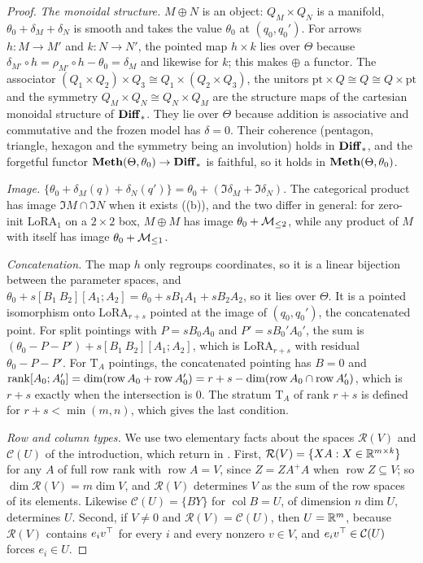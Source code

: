 \begin{proof}
\emph{The monoidal structure.} $M\oplus N$ is an object: $Q_M\times Q_N$ is a manifold, $\theta_0+\delta_M+\delta_N$ is
smooth and takes the value $\theta_0$ at $(q_0,q_0')$. For arrows $h:M\to M'$ and $k:N\to N'$, the pointed map $h\times k$
lies over $\Theta$ because $\delta_{M'}\circ h=\rho_{M'}\circ h-\theta_0=\delta_M$ and likewise for $k$; this makes $\oplus$
a functor. The associator $(Q_1\times Q_2)\times Q_3\cong Q_1\times(Q_2\times Q_3)$, the unitors
$\mathrm{pt}\times Q\cong Q\cong Q\times\mathrm{pt}$ and the symmetry $Q_M\times Q_N\cong Q_N\times Q_M$ are the
structure maps of the cartesian monoidal structure of $\mathbf{Diff}_*$. They lie over $\Theta$ because addition is associative and
commutative and the frozen model has $\delta=0$. Their coherence (pentagon, triangle, hexagon and the symmetry being an
involution) holds in $\mathbf{Diff}_*$, and the forgetful functor $\mathbf{Meth}(\Theta,\theta_0)\to\mathbf{Diff}_*$ is faithful, so it holds in
$\mathbf{Meth}(\Theta,\theta_0)$.

\emph{Image.} $\{\theta_0+\delta_M(q)+\delta_N(q')\}=\theta_0+(\Im\delta_M+\Im\delta_N)$. The categorical product has
image $\Im M\cap\Im N$ when it exists ((b)), and the two differ in general: for zero-init
$\mathrm{LoRA}_1$ on a $2\times2$ box, $M\oplus M$ has image $\theta_0+\mathcal{M}_{\le2}$, while any product of $M$ with itself
has image $\theta_0+\mathcal{M}_{\le1}$.

\emph{Concatenation.} The map $h$ only regroups coordinates, so it is a linear bijection between the parameter spaces,
and $\theta_0+s[B_1\ B_2][A_1;A_2]=\theta_0+sB_1A_1+sB_2A_2$, so it lies over $\Theta$. It is a pointed isomorphism onto
$\mathrm{LoRA}_{r+s}$ pointed at the image of $(q_0,q_0')$, the concatenated point. For split pointings with
$P=sB_0A_0$ and $P'=sB_0'A_0'$, the sum is $(\theta_0-P-P')+s[B_1\ B_2][A_1;A_2]$, which is $\mathrm{LoRA}_{r+s}$ with
residual $\theta_0-P-P'$. For $\mathrm T_A$ pointings, the concatenated pointing has $B=0$ and
$\operatorname{rank}[A_0;A_0']=\dim(\operatorname{row}A_0+\operatorname{row}A_0')=r+s-\dim(\operatorname{row}A_0\cap\operatorname{row}A_0')$,
which is $r+s$ exactly when the intersection is $0$. The stratum $\mathrm T_A$ of rank $r+s$ is defined for
$r+s<\min(m,n)$, which gives the last condition.

\emph{Row and column types.} We use two elementary facts about the spaces $\mathcal R(V)$ and $\mathcal C(U)$ of the
introduction, which return in . First, $\mathcal R(V)=\{XA:X\in\mathbb{R}^{m\times k}\}$ for any $A$ of full
row rank with $\operatorname{row}A=V$, since $Z=ZA^+A$ when $\operatorname{row}Z\subseteq V$; so $\dim\mathcal
R(V)=m\dim V$, and $\mathcal R(V)$ determines $V$ as the sum of the row spaces of its elements. Likewise
$\mathcal C(U)=\{BY\}$ for $\operatorname{col}B=U$, of dimension $n\dim U$, determines $U$. Second, if $V\ne0$ and
$\mathcal R(V)=\mathcal C(U)$, then $U=\mathbb{R}^m$, because $\mathcal R(V)$ contains $e_iv^{\top}$ for every $i$ and every nonzero
$v\in V$, and $e_iv^{\top}\in\mathcal C(U)$ forces $e_i\in U$.


\end{proof}
